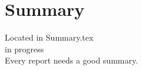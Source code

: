 \chapter{Summary}

{\color{blue} Located in {\ttfamily Summary.tex}}\\
{\color{green} in progress}\\

Every report needs a good summary. 